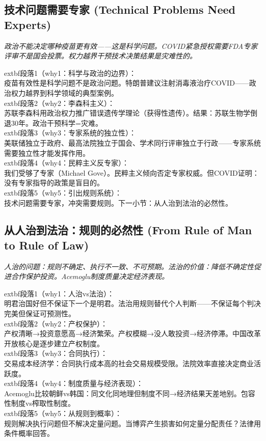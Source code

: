 \documentclass[a4paper,12pt]{book}
\newenvironment{motivation}{\begin{tcolorbox}[colback=gray!10,colframe=gray!60,title=\textit{动机}]\small\itshape}{\end{tcolorbox}}
\begin{document}
\begin{motivation}
\begin{motivation}
\begin{motivation}
	\subsection{技术问题需要专家 (Technical Problems Need Experts)}
	\begin{motivation}政治不能决定哪种疫苗更有效——这是科学问题。COVID紧急授权需要FDA专家评审不是国会投票。权力越界干预技术决策结果是灾难性的。\end{motivation}
		extbf{段落1（why1：科学与政治的边界）}：\\疫苗有效性是科学问题不是政治问题。特朗普建议注射消毒液治疗COVID——政治权力越界到科学领域的典型案例。\\	extbf{段落2（why2：李森科主义）}：\\苏联李森科用政治权力推广错误遗传学理论（获得性遗传）。结果：苏联生物学倒退30年。政治干预科学=灾难。\\	extbf{段落3（why3：专家系统的独立性）}：\\美联储独立于政府、最高法院独立于国会、学术同行评审独立于行政——专家系统需要独立性才能发挥作用。\\	extbf{段落4（why4：民粹主义反专家）}：\\我们受够了专家（Michael Gove）。民粹主义倾向否定专家权威。但COVID证明：没有专家指导的政策是盲目的。\\	extbf{段落5（why5：引出规则系统）}：\\技术问题需要专家，冲突需要规则。下一小节：从人治到法治的必然性。

	\subsection{从人治到法治：规则的必然性 (From Rule of Man to Rule of Law)}
	\begin{motivation}人治的问题：规则不确定、执行不一致、不可预期。法治的价值：降低不确定性促进合作保护投资。Acemoglu制度质量决定经济表现。\end{motivation}
		extbf{段落1（why1：人治vs法治）}：\\明君治国好但不保证下一个是明君。法治用规则替代个人判断——不保证每个判决完美但保证可预测性。\\	extbf{段落2（why2：产权保护）}：\\产权清晰→投资意愿高→经济繁荣。产权模糊→没人敢投资→经济停滞。中国改革开放核心是逐步建立产权制度。\\	extbf{段落3（why3：合同执行）}：\\交易成本经济学：合同执行成本高的社会交易规模受限。法院效率直接决定商业活跃度。\\	extbf{段落4（why4：制度质量与经济表现）}：\\Acemoglu比较朝鲜vs韩国：同文化同地理但制度不同→经济结果天差地别。包容性制度vs榨取性制度。\\	extbf{段落5（why5：从规则到概率）}：\\规则解决执行问题但不解决定量问题。当博弈产生损害如何定量分配责任？法律用条件概率回答。


\end{motivation}
\end{motivation}
\end{motivation}
\end{document}
